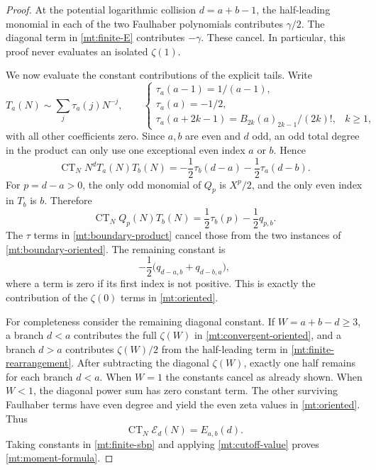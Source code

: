 \documentclass[11pt,letterpaper]{article}
\numberwithin{equation}{section}
\theoremstyle{plain}
\theoremstyle{definition}
\theoremstyle{remark}
\begin{document}
\begin{proof}
At the potential logarithmic collision $d=a+b-1$, the half-leading
monomial in each of the two Faulhaber polynomials contributes
$\gamma/2$. The diagonal term in \eqref{mt:finite-E} contributes
$-\gamma$. These cancel. In particular, this proof never evaluates
an isolated $\zeta(1)$.

We now evaluate the constant contributions of the explicit tails. Write
\begin{equation}\label{mt:tau}
 T_a(N)\sim\sum_j\tau_a(j)N^{-j},\qquad
 \begin{cases}
 \tau_a(a-1)=1/(a-1),\\
 \tau_a(a)=-1/2,\\
 \tau_a(a+2k-1)=B_{2k}(a)_{2k-1}/(2k)!,&k\ge1,
 \end{cases}
\end{equation}
with all other coefficients zero. Since $a,b$ are even and $d$ odd,
an odd total degree in the product can only use one exceptional even
index $a$ or $b$. Hence
\begin{equation}\label{mt:boundary-product}
 \operatorname{CT}_N N^dT_a(N)T_b(N)
 =-\frac12\tau_b(d-a)-\frac12\tau_a(d-b).
\end{equation}
For $p=d-a>0$, the only odd monomial of $Q_p$ is $X^p/2$,
and the only even index in $T_b$ is $b$. Therefore
\begin{equation}\label{mt:boundary-oriented}
 \operatorname{CT}_N Q_p(N)T_b(N)
 =\frac12\tau_b(p)-\frac12q_{p,b}.
\end{equation}
The $\tau$ terms in \eqref{mt:boundary-product} cancel those from
the two instances of \eqref{mt:boundary-oriented}. The remaining
constant is
\begin{equation}\label{mt:boundary-constant}
 -\frac12\bigl(q_{d-a,b}+q_{d-b,a}\bigr),
\end{equation}
where a term is zero if its first index is not positive. This is
exactly the contribution of the $\zeta(0)$ terms in
\eqref{mt:oriented}.

For completeness consider the remaining diagonal constant. If
$W=a+b-d\ge3$, a branch $d<a$ contributes the full $\zeta(W)$
in \eqref{mt:convergent-oriented}, and a branch $d>a$ contributes
$\zeta(W)/2$ from the half-leading term in
\eqref{mt:finite-rearrangement}. After subtracting the diagonal
$\zeta(W)$, exactly one half remains for each branch $d<a$.
When $W=1$ the constants cancel as already shown. When $W<1$,
the diagonal power sum has zero constant term. The other surviving
Faulhaber terms have even degree and yield the even zeta values in
\eqref{mt:oriented}. Thus
\[
 \operatorname{CT}_N\mathcal E_d(N)=E_{a,b}(d).
\]
Taking constants in \eqref{mt:finite-sbp} and applying
\eqref{mt:cutoff-value} proves \eqref{mt:moment-formula}.
\end{proof}
\end{document}
